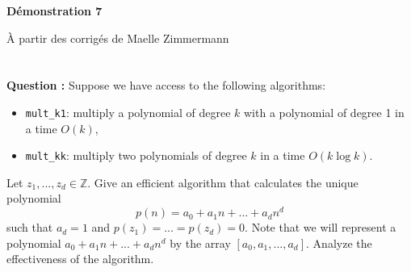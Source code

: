 \documentclass[11pt]{article} %
\newenvironment{question}[1][\unskip]{%
	\par
	\noindent
	\textbf{Question #1:}
	\noindent}
{\medskip}
\begin{document}

	\noindent \hrulefill
	\centerline{\bfseries Démonstration 7}
	\centerline{À partir des corrigés de Maelle Zimmermann}	
	\noindent \hrulefill
	
	\vspace{1cm}
		\section{}
	\begin{question}
		Suppose we have access to the following algorithms:
		\begin{itemize}
			\item {\verb|mult_k1|: multiply a polynomial of degree $ k $ with a polynomial of degree 1 in a time $ O (k) $,}
			\item{\verb|mult_kk|: multiply two polynomials of degree $ k $ in a time $ O (k \log k) $.}
		\end{itemize}
		Let $ z_1, ..., z_d \in \mathbb {Z} $. Give an efficient algorithm that calculates the unique polynomial $$ p (n) = a_0 + a_1 n + ... + a_d n ^ d $$ such that $ a_d = 1 $ and $ p (z_1) = ... = p (z_d) = 0. $ Note that we will represent a polynomial $ a_0 + a_1 n + ... + a_d n ^ d $ by the array $ [a_0, a_1, ..., a_d] $. Analyze the effectiveness of the algorithm.
	\end{question}
\end{document}
